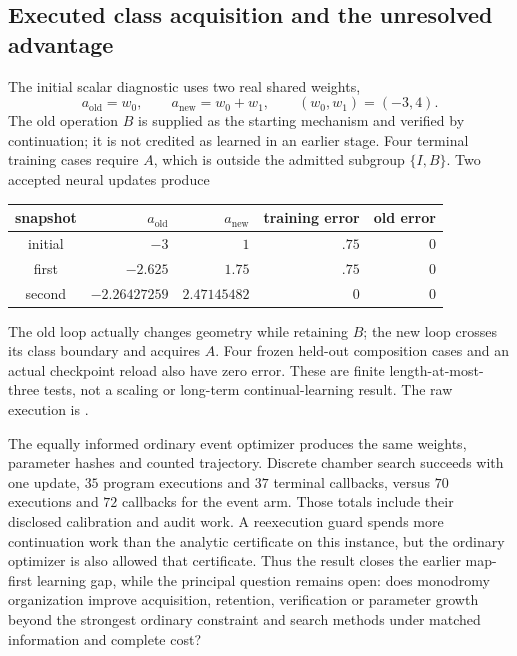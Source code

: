 \subsection{Executed class acquisition and the unresolved advantage}

The initial scalar diagnostic uses two real shared weights,
\begin{equation}
 a_{\mathrm{old}}=w_0,\qquad
 a_{\mathrm{new}}=w_0+w_1,\qquad (w_0,w_1)=(-3,4).
\end{equation}
The old operation $B$ is supplied as the starting mechanism and verified by
continuation; it is not credited as learned in an earlier stage. Four
terminal training cases require $A$, which is outside the admitted subgroup
$\{I,B\}$. Two accepted neural updates produce
\begin{center}
\begin{tabular}{c|rr|rr}
snapshot & $a_{\mathrm{old}}$ & $a_{\mathrm{new}}$
         & training error & old error\\\hline
initial & $-3$ & $1$ & $.75$ & $0$\\
first & $-2.625$ & $1.75$ & $.75$ & $0$\\
second & $-2.26427259$ & $2.47145482$ & $0$ & $0$
\end{tabular}
\end{center}
The old loop actually changes geometry while retaining $B$; the new loop
crosses its class boundary and acquires $A$. Four frozen held-out composition
cases and an actual checkpoint reload also have zero error. These are finite
length-at-most-three tests, not a scaling or long-term continual-learning
result. The raw execution is
.

The equally informed ordinary event optimizer produces the same weights,
parameter hashes and counted trajectory. Discrete chamber search succeeds
with one update, $35$ program executions and $37$ terminal callbacks, versus
$70$ executions and $72$ callbacks for the event arm. Those totals include
their disclosed calibration and audit work. A reexecution guard spends more
continuation work than the analytic certificate on this instance, but the
ordinary optimizer is also allowed that certificate. Thus the result closes
the earlier map-first learning gap, while the principal question remains open:
does monodromy organization improve acquisition, retention, verification or
parameter growth beyond the strongest ordinary constraint and search methods
under matched information and complete cost?

